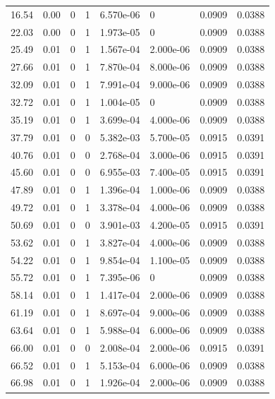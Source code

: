 \documentclass[preview]{standalone}
\begin{document}
{{\begin{tabular}{L{1.2cm}C{1.2cm} C{0.3cm}C{0.5cm} C{1.4cm}C{1.4cm} C{1.4cm}C{1.4cm}}
  16.54  &  0.00  & 0     &  1 &  6.570e-06  & 0  & 0.0909 &  0.0388   \\ 
  22.03  &  0.00  & 0     &  1 &  1.973e-05  & 0  & 0.0909 &  0.0388   \\ 
  25.49  &  0.01  & 0     &  1 &  1.567e-04  & 2.000e-06  & 0.0909 &  0.0388   \\ 
  27.66  &  0.01  & 0     &  1 &  7.870e-04  & 8.000e-06  & 0.0909 &  0.0388   \\ 
  32.09  &  0.01  & 0     &  1 &  7.991e-04  & 9.000e-06  & 0.0909 &  0.0388   \\ 
  32.72  &  0.01  & 0     &  1 &  1.004e-05  & 0  & 0.0909 &  0.0388   \\ 
  35.19  &  0.01  & 0     &  1 &  3.699e-04  & 4.000e-06  & 0.0909 &  0.0388   \\ 
  37.79  &  0.01  & 0     &  0 &  5.382e-03  & 5.700e-05  & 0.0915 &  0.0391   \\ 
  40.76  &  0.01  & 0     &  0 &  2.768e-04  & 3.000e-06  & 0.0915 &  0.0391   \\ 
  45.60  &  0.01  & 0     &  0 &  6.955e-03  & 7.400e-05  & 0.0915 &  0.0391   \\ 
  47.89  &  0.01  & 0     &  1 &  1.396e-04  & 1.000e-06  & 0.0909 &  0.0388   \\ 
  49.72  &  0.01  & 0     &  1 &  3.378e-04  & 4.000e-06  & 0.0909 &  0.0388   \\ 
  50.69  &  0.01  & 0     &  0 &  3.901e-03  & 4.200e-05  & 0.0915 &  0.0391   \\ 
  53.62  &  0.01  & 0     &  1 &  3.827e-04  & 4.000e-06  & 0.0909 &  0.0388   \\ 
  54.22  &  0.01  & 0     &  1 &  9.854e-04  & 1.100e-05  & 0.0909 &  0.0388   \\ 
  55.72  &  0.01  & 0     &  1 &  7.395e-06  & 0  & 0.0909 &  0.0388   \\ 
  58.14  &  0.01  & 0     &  1 &  1.417e-04  & 2.000e-06  & 0.0909 &  0.0388   \\ 
  61.19  &  0.01  & 0     &  1 &  8.697e-04  & 9.000e-06  & 0.0909 &  0.0388   \\ 
  63.64  &  0.01  & 0     &  1 &  5.988e-04  & 6.000e-06  & 0.0909 &  0.0388   \\ 
  66.00  &  0.01  & 0     &  0 &  2.008e-04  & 2.000e-06  & 0.0915 &  0.0391   \\ 
  66.52  &  0.01  & 0     &  1 &  5.153e-04  & 6.000e-06  & 0.0909 &  0.0388   \\ 
  66.98  &  0.01  & 0     &  1 &  1.926e-04  & 2.000e-06  & 0.0909 &  0.0388   \\ 

\end{tabular}}}
\end{document}
